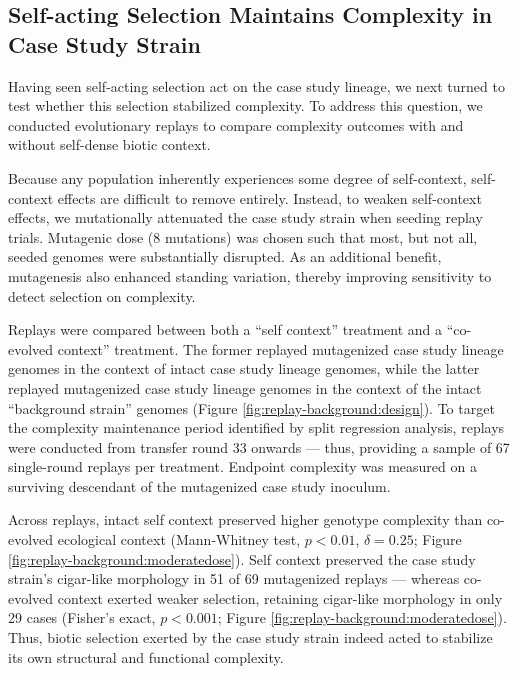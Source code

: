 \subsection{Self-acting Selection Maintains Complexity in Case Study Strain}
\label{sec:self-acting-selection-maintains-complexity-in-case-study-strain}



Having seen self-acting selection act on the case study lineage, we next turned to test whether this selection stabilized complexity.
To address this question, we conducted evolutionary replays to compare complexity outcomes with and without self-dense biotic context.

Because any population inherently experiences some degree of self-context, self-context effects are difficult to remove entirely.
Instead, to weaken self-context effects, we mutationally attenuated the case study strain when seeding replay trials.
Mutagenic dose (8 mutations) was chosen such that most, but not all, seeded genomes were substantially disrupted.
As an additional benefit, mutagenesis also enhanced standing variation, thereby improving sensitivity to detect selection on complexity.

Replays were compared between both a ``self context'' treatment and a ``co-evolved context'' treatment.
The former replayed mutagenized case study lineage genomes in the context of intact case study lineage genomes, while the latter replayed mutagenized case study lineage genomes in the context of the intact ``background strain'' genomes  (Figure \ref{fig:replay-background:design}).
To target the complexity maintenance period identified by split regression analysis, replays were conducted from transfer round 33 onwards --- thus, providing a sample of 67 single-round replays per treatment.
Endpoint complexity was measured on a surviving descendant of the mutagenized case study inoculum.

Across replays, intact self context preserved higher genotype complexity than co-evolved ecological context
(Mann-Whitney test, $p < 0.01$, $\delta = 0.25$; Figure \ref{fig:replay-background:moderatedose}).
Self context preserved the case study strain's cigar-like morphology in 51 of 69 mutagenized replays --- whereas co-evolved context exerted weaker selection, retaining cigar-like morphology in only 29 cases (Fisher's exact, $p < 0.001$; Figure \ref{fig:replay-background:moderatedose}).
Thus, biotic selection exerted by the case study strain indeed acted to stabilize its own structural and functional complexity.

